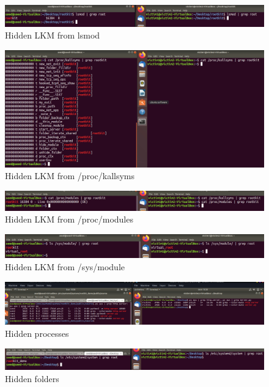 \documentclass[11pt, a4paper,twoside]{tesi_upf}
\begin{document}
\begin{figure}[H]
\centering
\includegraphics[width=\linewidth]{images/hide-lsmod.png}
    \caption{Hidden LKM from lsmod}
\end{figure}
\begin{figure}[H]
\centering
\includegraphics[width=\linewidth]{images/hide-kallsyms.png}
    \caption{Hidden LKM from /proc/kallsyms}
\end{figure}
\begin{figure}[H]
\centering
\includegraphics[width=\linewidth]{images/hide-proc-modules.png}
    \caption{Hidden LKM from /proc/modules}
\end{figure}
\begin{figure}[H]
\centering
\includegraphics[width=\linewidth]{images/hide-sys-module.png}
    \caption{Hidden LKM from /sys/module}
\end{figure}
\begin{figure}[H]
\centering
\includegraphics[width=\linewidth]{images/hide-ps.png}
    \caption{Hidden processes}
\end{figure}
\begin{figure}[H]
\centering
\includegraphics[width=\linewidth]{images/hide-folder.png}
    \caption{Hidden folders}
\end{figure}
\end{document}
